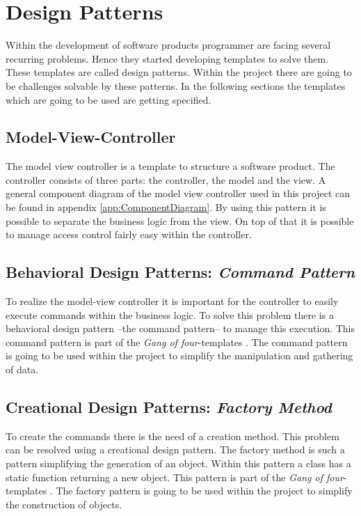 \documentclass[11pt,a4paper]{report}
\begin{document}
\section{Design Patterns}
Within the development of software products programmer are facing several recurring problems. Hence they started developing templates to solve them.  These templates are called design patterns. Within the project there are going to be challenges solvable by these patterns. In the following sections the templates which are going to be used are getting specified.

\subsection{Model-View-Controller}
The model view controller is a template to structure a software product. The controller consists of three parts: the controller, the model and the view. A general component diagram of the model view controller used in this project can be found in appendix \vref{app:ComponentDiagram}. By using this pattern it is possible to separate the business logic from the view. On top of that it is possible to manage access control fairly easy within the controller. 

\subsection{Behavioral Design Patterns: \emph{Command Pattern}}
To realize the model-view controller it is important for the controller to easily execute commands within the business logic. To solve this problem there is a behavioral design pattern --the command pattern-- to manage this execution. This command pattern is part of the \emph{Gang of four}-templates \cite{Gamma:1994aa}. The command pattern is going to be used within the project to simplify the manipulation and gathering of data.

\subsection{Creational Design Patterns: \emph{Factory Method}}
To create the commands there is the need of a creation method. This problem can be resolved using a creational design pattern. The factory method is such a pattern simplifying the generation of an object. Within this pattern a class has a static function returning a new object. This pattern is part of the \emph{Gang of four}-templates \cite{Gamma:1994aa}. The factory pattern is going to be used within the project to simplify the construction of objects.
\end{document}
